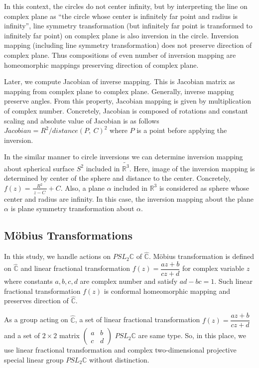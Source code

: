 In this context, the circles do not center infinity, but 
by interpreting the line on complex plane as ``the circle whose center is
infinitely far point and radius is infinity'', 
line symmetry transformation (but infinitely far point is
transformed to infinitely far point) on complex plane 
is also inversion in the circle.
Inversion mapping (including line symmetry transformation) does not
preserve direction of complex plane.
Thus compositions of even number of inversion mapping are homeomorphic
mappings preserving direction of complex plane.

Later, we compute Jacobian of inverse mapping.
This is Jacobian matrix as mapping from complex plane to complex plane.
Generally, inverse mapping preserve angles.
From this property, Jacobian mapping is given by multiplication of complex
number.
Concretely, Jacobian is composed of rotations and constant scaling
and absolute value of Jacobian is as follows
$Jacobian = R^2 / distance(P,~C)^2$
where $P$ is a point before applying the inversion.

In the similar manner to circle inversions we can determine inversion
mapping about spherical surface $S^2$ included in $\tilde{\mathbb{R}^3}$.
Here, image of the inversion mapping is determined by center of the sphere and
distance to the center.
Concretely, $f(z) = \frac{R^2}{~\overline{z -C}~} + C$.
Also, a plane $\alpha$ included in $\mathbb{R}^3$ is considered as
sphere whose center and radius are infinity.
In this case, the inversion mapping about the plane $\alpha$ is plane symmetry
transformation about $\alpha$.

\subsection{M\"obius Transformations}

In this study, we handle actions on $PSL_2\mathbb{C}$ of $\hat{\mathbb{C}}$.
M\"obius transformation is defined on $\hat{\mathbb{C}}$ and
linear fractional transformation
$f(z)=\dfrac{az+b}{cz+d}$ for complex variable $z$ where constants
$a, b, c, d$ are complex number and satisfy $ad - bc = 1$.
Such linear fractional transformation $f(z)$ is conformal homeomorphic
mapping and preserves direction of $\hat{\mathbb{C}}$.

As a group acting on $\hat{\mathbb{C}}$, a set of linear fractional
transformation $f(z) = \dfrac{az + b}{cz + d}$
and a set of $2 \times 2$ matrix
$\begin{pmatrix}a & b \\ c& d \end{pmatrix}$
$PSL_2\mathbb{C}$ are same type.
So, in this place, we use linear fractional transformation and
complex two-dimensional projective special linear group
$PSL_2\mathbb{C}$ without distinction.

